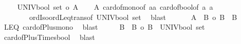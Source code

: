 \begin{isabellebody}
\ \ \isamarkupfalse%
\ {}{\isacharcolon}{\kern0pt}\ {\isachardoublequoteopen}{\isacharbar}{\kern0pt}UNIV{\isacharcolon}{\kern0pt}{\isacharcolon}{\kern0pt}bool\ set{\isacharbar}{\kern0pt}\ {\isasymle}o\ {\isacharbar}{\kern0pt}A{\isacharbar}{\kern0pt}{\isachardoublequoteclose}\isanewline
\ \ \isamarkupfalse%
\ A{}\ card{\isacharunderscore}{\kern0pt}of{\isacharunderscore}{\kern0pt}mono{}{\isacharbrackleft}{\kern0pt}of\ {\isachardoublequoteopen}{\isacharbraceleft}{\kern0pt}a{}{\isacharcomma}{\kern0pt}a{}{\isacharbraceright}{\kern0pt}{\isachardoublequoteclose}{\isacharbrackright}{\kern0pt}\ card{\isacharunderscore}{\kern0pt}of{\isacharunderscore}{\kern0pt}bool{\isacharbrackleft}{\kern0pt}of\ a{}\ a{}{\isacharbrackright}{\kern0pt}\isanewline
\ \ \ \ \ \ \ \ ordIso{\isacharunderscore}{\kern0pt}ordLeq{\isacharunderscore}{\kern0pt}trans{\isacharbrackleft}{\kern0pt}of\ {\isachardoublequoteopen}{\isacharbar}{\kern0pt}UNIV{\isacharcolon}{\kern0pt}{\isacharcolon}{\kern0pt}bool\ set{\isacharbar}{\kern0pt}{\isachardoublequoteclose}{\isacharbrackright}{\kern0pt}\ \isamarkupfalse%
\ blast\isanewline
\ \ \isanewline
\ \ \isamarkupfalse%
\ {\isachardoublequoteopen}{\isacharbar}{\kern0pt}A\ {\isacharless}{\kern0pt}{\isacharplus}{\kern0pt}{\isachargreater}{\kern0pt}\ B{\isacharbar}{\kern0pt}\ {\isasymle}o\ {\isacharbar}{\kern0pt}B\ {\isacharless}{\kern0pt}{\isacharplus}{\kern0pt}{\isachargreater}{\kern0pt}\ B{\isacharbar}{\kern0pt}{\isachardoublequoteclose}\isanewline
\ \ \isamarkupfalse%
\ LEQ\ card{\isacharunderscore}{\kern0pt}of{\isacharunderscore}{\kern0pt}Plus{\isacharunderscore}{\kern0pt}mono{}\ \isamarkupfalse%
\ blast\isanewline
\ \ \isamarkupfalse%
\ \isamarkupfalse%
\ {\isachardoublequoteopen}{\isacharbar}{\kern0pt}B\ {\isacharless}{\kern0pt}{\isacharplus}{\kern0pt}{\isachargreater}{\kern0pt}\ B{\isacharbar}{\kern0pt}\ {\isacharequal}{\kern0pt}o\ {\isacharbar}{\kern0pt}B\ {\isasymtimes}\ {\isacharparenleft}{\kern0pt}UNIV{\isacharcolon}{\kern0pt}{\isacharcolon}{\kern0pt}bool\ set{\isacharparenright}{\kern0pt}{\isacharbar}{\kern0pt}{\isachardoublequoteclose}\isanewline
\ \ \isamarkupfalse%
\ card{\isacharunderscore}{\kern0pt}of{\isacharunderscore}{\kern0pt}Plus{\isacharunderscore}{\kern0pt}Times{\isacharunderscore}{\kern0pt}bool\ \isamarkupfalse%
\ blast\isanewline
\ \ \isamarkupfalse%

\end{isabellebody}
